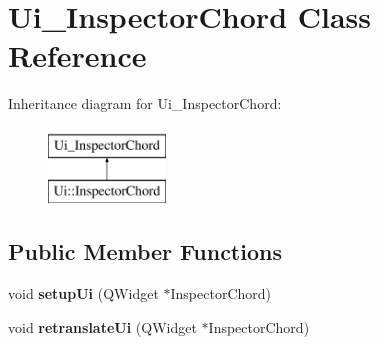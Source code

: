 \hypertarget{class_ui___inspector_chord}{}\section{Ui\+\_\+\+Inspector\+Chord Class Reference}
\label{class_ui___inspector_chord}
Inheritance diagram for Ui\+\_\+\+Inspector\+Chord\+:\begin{figure}[H]
\begin{center}
\leavevmode
\includegraphics[height=2.000000cm]{class_ui___inspector_chord}
\end{center}
\end{figure}
\subsection*{Public Member Functions}
\begin{DoxyCompactItemize}
\item 
\mbox{\label{class_ui___inspector_chord_a8df4db50f3178a8d1b9fab5c4eb668da}} 
void {\bfseries setup\+Ui} (Q\+Widget $\ast$Inspector\+Chord)
\item 
\mbox{\label{class_ui___inspector_chord_a0450d5ed05c21775c0d0d7d7078a6461}} 
void {\bfseries retranslate\+Ui} (Q\+Widget $\ast$Inspector\+Chord)
\end{DoxyCompactItemize}
